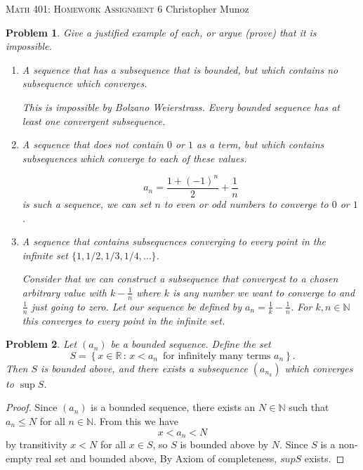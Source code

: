 \documentclass[12pt]{article}
\newtheorem{problem}{Problem}
\newcommand{\NN}{\ensuremath{\mathbb N}}
\newcommand{\RR}{\ensuremath{\mathbb R}}
\begin{document}
\small
\noindent \textsc{Math 401: Homework Assignment 6} \hfill Christopher Munoz

\normalsize
\bigskip

\setcounter{problem}{35}

\begin{problem} %
Give a justified example of each, or argue (prove) that it is impossible.

\renewcommand{\labelenumi}{(\alph{enumi})}
\begin{enumerate}
\item A sequence that has a subsequence that is bounded, but which contains no subsequence which converges.

This is impossible by Bolzano Weierstrass. Every bounded sequence has at least one convergent subsequence.

\item A sequence that does not contain $0$ or $1$ as a term, but which contains subsequences which converge to each of these values.

$$a_n = \frac{1 + (-1)^n}{2} + \frac{1}{n}$$ is such a sequence, we can set $n$ to even or odd numbers to converge to $0$ or $1$.

\item A sequence that contains subsequences converging to every point in the infinite set $\{1,1/2,1/3,1/4,\dots\}$.

  Consider that we can construct a subsequence that convergest to a chosen arbitrary value with $k - \frac{1}{n}$ where $k$ is any number we want to converge to and $\frac{1}{n}$ just going to zero. Let our sequence be defined by $a_n = \frac{1}{k} - \frac{1}{n}$. For $k, n \in \NN$ this converges to every point in the infinite set.

\end{enumerate}
\end{problem}


\begin{problem} %
Let $(a_n)$ be a bounded sequence.  Define the set
	$$S = \left\{x\in\RR\,:\, x < a_n \,\text{ for infinitely many terms } a_n\right\}.$$
Then $S$ is bounded above, and there exists a subsequence $(a_{n_k})$ which converges to $\sup S$.
\end{problem}

\begin{proof}
Since $(a_n)$ is a bounded sequence, there exists an $N \in \NN$ such that $a_n \leq N$ for all $n \in \NN$. From this we have
$$x < a_n < N$$
by transitivity $x < N$ for all $x \in S$, so $S$ is bounded above by $N$. Since $S$ is a non-empty real set and bounded above, By Axiom of completeness, $sup S$ exists.
\end{proof}
\end{document}
